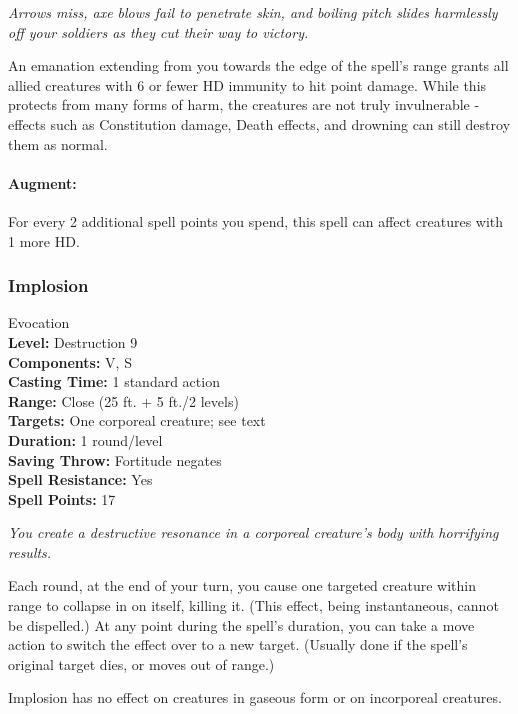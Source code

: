 \emph{Arrows miss, axe blows fail to penetrate skin, and boiling pitch slides harmlessly off your soldiers as they cut their way to victory.}

An emanation extending from you towards the edge of the spell's range grants all allied creatures with 6 or fewer HD immunity to hit point damage.
While this protects from many forms of harm, the creatures are not truly invulnerable - effects such as Constitution damage, Death effects, and drowning can still destroy them as normal.

\paragraph{Augment:} For every 2 additional spell points you spend, this spell can affect creatures with 1 more HD.

\subsubsection{Implosion}
\label{Spell:Implosion}
Evocation
\\ \textbf{Level:} Destruction 9
\\ \textbf{Components:} V, S
\\ \textbf{Casting Time:} 1 standard action
\\ \textbf{Range:} Close (25 ft. + 5 ft./2 levels)
\\ \textbf{Targets:} One corporeal creature; see text
\\ \textbf{Duration:} 1 round/level
\\ \textbf{Saving Throw:} Fortitude negates
\\ \textbf{Spell Resistance:} Yes
\\ \textbf{Spell Points:} 17

\emph{You create a destructive resonance in a corporeal creature's body with horrifying results.}

Each round, at the end of your turn, you cause one targeted creature within range to collapse in on itself, killing it. (This effect, being instantaneous, cannot be dispelled.)
At any point during the spell's duration, you can take a move action to switch the effect over to a new target. (Usually done if the spell's original target dies, or moves out of range.)

Implosion has no effect on creatures in gaseous form or on incorporeal creatures.
